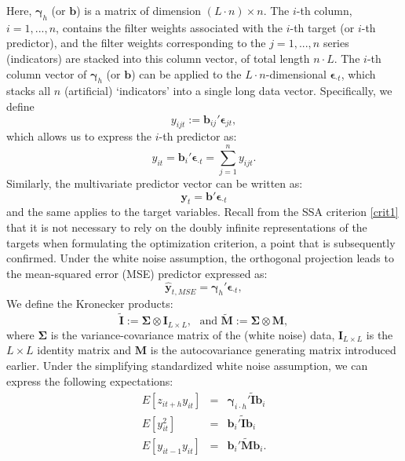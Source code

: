 \documentclass[11pt,a4paper]{article}
\begin{document}
Here, $\boldsymbol{\gamma}_{h}$ (or $\mathbf{b}$) is a matrix of dimension $(L\cdot n)\times n$. The $i$-th column, $i=1,...,n$, contains the filter weights associated with the $i$-th target (or $i$-th predictor), and the filter weights corresponding to the $j=1,...,n$ series (indicators) are stacked into this column vector, of total length $n\cdot L$. The $i$-th column vector of $\boldsymbol{\gamma}_{h}$ (or $\mathbf{b}$) can be applied to the $L\cdot n$-dimensional $\boldsymbol{\epsilon}_{\cdot t}$, which stacks all $n$ (artificial) `indicators' into a single long data vector. Specifically, we define 
\[
y_{ijt} := \mathbf{b}_{ij}'\boldsymbol{\epsilon}_{jt},
\]
which allows us to express the $i$-th predictor as:
\[
y_{it} = \mathbf{b}_i'\boldsymbol{\epsilon}_{\cdot t} = \sum_{j=1}^n y_{ijt}.
\] 
Similarly, the multivariate predictor vector can be written as:
\[
\mathbf{y}_t = \mathbf{b}'\boldsymbol{\epsilon}_{\cdot t}
\]
and the same applies to the target variables. Recall from the SSA criterion \eqref{crit1}  that it is not necessary to rely on the doubly infinite representations of the targets when formulating the optimization criterion, a point that is subsequently confirmed. Under the white noise assumption, the orthogonal projection leads to the mean-squared error (MSE) predictor expressed as:
\[
\hat{\mathbf{y}}_{t,MSE} = \boldsymbol{\gamma}_{h}'\boldsymbol{\epsilon}_{\cdot t},
\]
We define the Kronecker products: 
\[
\tilde{\mathbf{I}}:=\boldsymbol{\Sigma}\otimes\mathbf{I}_{L\times L},\textrm{ ~and~} \tilde{\mathbf{M}}:=\boldsymbol{\Sigma}\otimes\mathbf{M},
\]
where $\boldsymbol{\Sigma}$ is the variance-covariance matrix of the (white noise) data,  $\mathbf{I}_{L\times L}$ is the  $L\times L$ identity matrix  and  $\mathbf{M}$ is the autocovariance generating matrix introduced earlier. Under the simplifying standardized white noise assumption, we can express the following expectations: 
\begin{eqnarray}
E[z_{it+h}y_{it}]&=&\boldsymbol{\gamma}_{i\cdot h}'\tilde{\mathbf{I}}\mathbf{b}_{i}\nonumber\\%
E[y_{it}^2]&=&\mathbf{b}_{i}'\tilde{\mathbf{I}}\mathbf{b}_{i}\nonumber\\%
E[y_{it-1}y_{it}]&=&\mathbf{b}_{i}'\tilde{\mathbf{M}}\mathbf{b}_{i}.\nonumber
\end{eqnarray}
\end{document}
